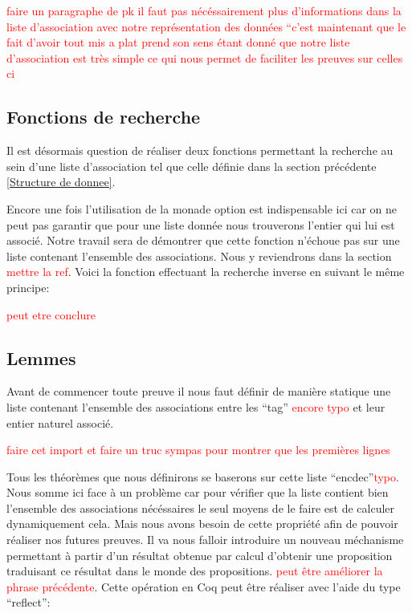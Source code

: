 \documentclass {article}
\newcommand{\codefrom}[3]
           {}
\theoremstyle{definition}
\theoremstyle{remark}
\newcommand{\todo}[1]{\textcolor{red}{#1}}
\begin{document}
\todo{faire un paragraphe de pk il faut pas nécéssairement plus d'informations dans la liste
  d'association avec notre représentation des données ``c'est maintenant que le fait d'avoir tout mis a plat prend son sens
étant donné que notre liste d'association est très simple ce qui nous permet de faciliter les preuves sur celles ci}


\subsection{Fonctions de recherche}

Il est désormais question de réaliser deux fonctions permettant la recherche
au sein d'une liste d'association tel que celle définie dans la section précédente
\ref{Structure de donnee}.

\codefrom{src}{association_list}{lookup}

Encore une fois l'utilisation de la monade option est indispensable ici car
on ne peut pas garantir que pour une liste donnée nous trouverons l'entier
qui lui est associé. Notre travail sera de démontrer que cette fonction n'échoue pas
sur une liste contenant l'ensemble des associations. Nous y reviendrons dans la section
\todo{mettre la ref}.
Voici la fonction effectuant la recherche inverse en suivant le même principe:

\codefrom{src}{association_list}{lookdown}

\todo{peut etre conclure}




\subsection{Lemmes}

Avant de commencer toute preuve il nous faut définir de manière statique une liste
contenant l'ensemble des associations entre les ``tag'' \todo{encore typo} et leur entier naturel associé.

\todo{faire cet import et faire un truc sympas pour montrer que les premières lignes}
\codefrom{src}{association_list}{lol}

Tous les théorèmes que nous définirons se baserons sur cette liste ``encdec''\todo{typo}. \\
Nous somme ici face à un problème car pour vérifier que la liste contient bien l'ensemble des
associations nécéssaires le seul moyens de le faire est de calculer dynamiquement cela.
Mais nous avons besoin de cette propriété afin de pouvoir réaliser nos futures preuves.
Il va nous falloir introduire un nouveau méchanisme permettant à partir d'un résultat obtenue
par calcul d'obtenir une proposition traduisant ce résultat dans le monde des propositions.
\todo{peut être améliorer la phrase précédente}.
Cette opération en Coq peut être réaliser avec l'aide du type ``reflect'':
\end{document}
